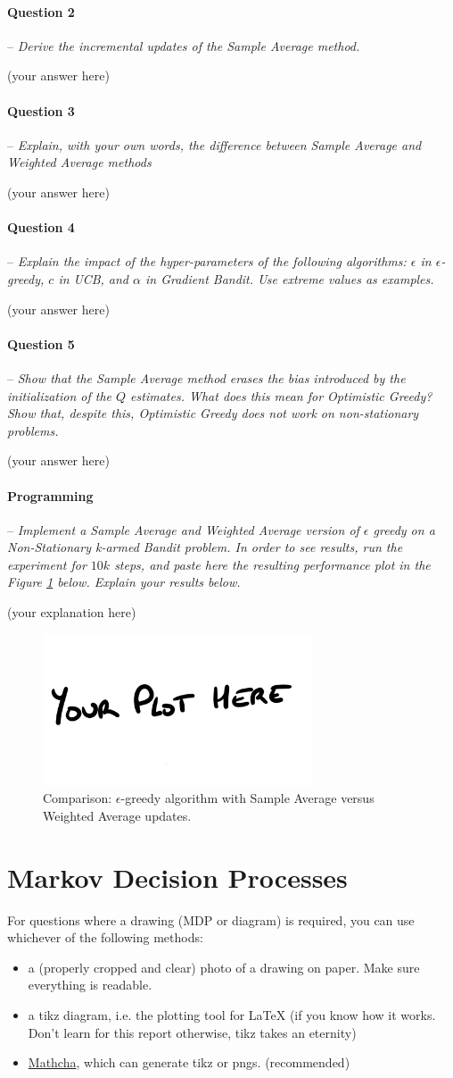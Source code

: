 \documentclass[a4paper]{article}
\newcommand{\question}[2]{
\paragraph{Question #1} -- \textit{#2}

}
\newcommand{\programming}[1]{
\paragraph{Programming} -- \textit{#1}

}
\begin{document}
\question{2}{Derive the incremental updates of the Sample 
Average method.}
(your answer here)


\question{3}{Explain, with your own words, the difference between Sample Average and Weighted Average methods}
(your answer here)

\question{4}{Explain the impact of the hyper-parameters of the following algorithms: $\epsilon$ in $\epsilon$-greedy, $c$ in UCB, and $\alpha$ in Gradient Bandit. Use extreme values as examples.}
(your answer here)

\question{5}{Show that the Sample Average method erases the bias introduced by the initialization of the $Q$ estimates. What does this mean for Optimistic Greedy? Show that, despite this, Optimistic Greedy does not work on non-stationary problems.}
(your answer here)

\programming{Implement a Sample Average and Weighted Average version of $\epsilon$ greedy on a Non-Stationary k-armed Bandit problem. In order to see results, run the experiment for $10k$ steps, and paste here the resulting performance plot in the Figure \ref{fig:sa_vs_wa} below. Explain your results below.}
(your explanation here)
\begin{figure}[H]
    \centering
    \includegraphics[width=8cm]{plots/your_plot_here.png}
    \caption{Comparison: $\epsilon$-greedy algorithm with Sample Average versus Weighted Average updates.}
    \label{fig:sa_vs_wa}
\end{figure}{}


\section{Markov Decision Processes}
For questions where a drawing (MDP or diagram) is required, you can use whichever of the following methods:
\begin{itemize}
    \item a (properly cropped and clear) photo of a drawing on paper. Make sure everything is readable.
    \item a tikz diagram, i.e. the plotting tool for LaTeX (if you know how it works. Don't learn for this report otherwise, tikz takes an eternity)
    \item \href{www.mathcha.io}{Mathcha}, which can generate tikz or pngs. (recommended)
\end{itemize}{}
\end{document}
